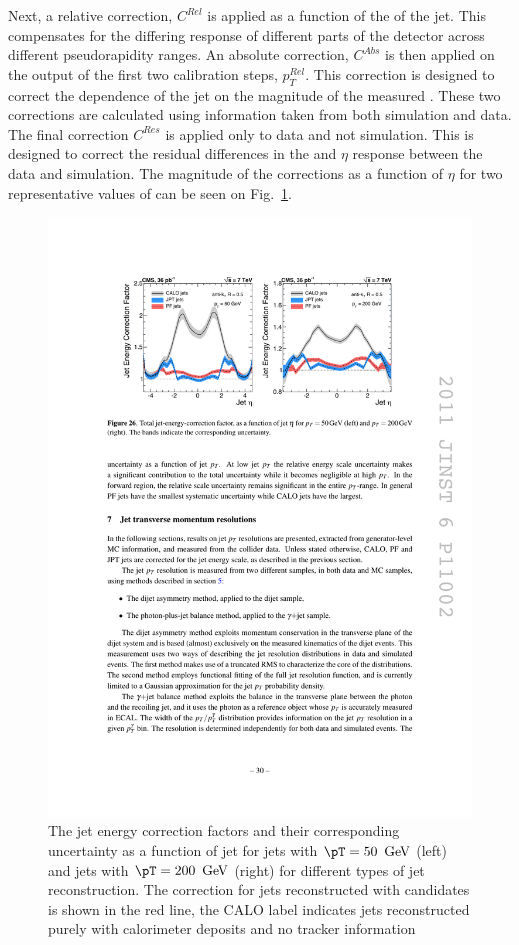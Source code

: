 Next, a relative correction, $C^{Rel}$ is applied as a function of the
\eta of the jet. This compensates for the differing response of
different parts of the detector across different pseudorapidity
ranges. An absolute correction, $C^{Abs}$ is then applied on the
output of the first two calibration steps, $p_T^{Rel}$. This
correction is designed to correct the dependence of the jet \pT on the
magnitude of the measured \pT. These two corrections are calculated
using information taken from both simulation and data.%
The final correction $C^{Res}$ is applied only to data and not
simulation. This is designed to correct the residual differences in
the \pT and $\eta$ response between the data and simulation. The
magnitude of the corrections as a function of $\eta$ for two
representative values of \pT can be seen on Fig.~\ref{fig:jec}.


\begin{figure}
\begin{center}
\includegraphics[width=0.9\linewidth]{figs/reconstruction/jec} \end{center}
\caption{The jet energy correction factors and their corresponding
uncertainty as a function of jet \eta
for jets with $\pT=50~\gev$ (left) and jets with $\pT=200~\gev$
(right) for different types of jet reconstruction. The correction for jets
reconstructed with \PF candidates is shown in the red line, the CALO
label indicates jets reconstructed purely with calorimeter deposits
and no tracker information \cite{1748-0221-6-11-P11002}}
\label{fig:jec} \end{figure}

